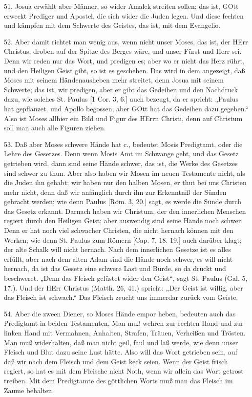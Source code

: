 51. Josua erwählt aber Männer, so wider Amalek streiten sollen; das ist, GOtt erweckt Prediger und Apostel, die sich wider die Juden legen. Und diese fechten und kämpfen mit dem Schwerte des Geistes, das ist, mit dem Evangelio.

52. Aber damit richtet man wenig aus, wenn nicht unser Moses, das ist, der HErr Christus, droben auf der Spitze des Berges wäre, und unser Fürst und Herr sei. Denn wir reden nur das Wort, und predigen es; aber wo er nicht das Herz rührt, und den Heiligen Geist gibt, so ist es geschehen. Das wird in dem angezeigt, daß Moses mit seinem Händenausheben mehr streitet, denn Josua mit seinem Schwerte; das ist, wir predigen, aber er gibt das Gedeihen und den Nachdruck dazu, wie solches St. Paulus [1 Cor. 3, 6.] auch bezeugt, da er spricht: „Paulus hat gepflanzet, und Apollo begossen, aber GOtt hat das Gedeihen dazu gegeben.“ Also ist Moses allhier ein Bild und Figur des HErrn Christi, denn auf Christum soll man auch alle Figuren ziehen.

53. Daß aber Moses schwere Hände hat c., bedeutet Mosis Predigtamt, oder die Lehre des Gesetzes. Denn wenn Mosis Amt im Schwange geht, und das Gesetz getrieben wird, dann sind seine Hände schwer, das ist, die Werke des Gesetzes sind schwer zu thun. Aber also haben wir Mosen im neuen Testamente nicht, als die Juden ihn gehabt; wir haben nur den halben Mosen, er thut bei uns Christen mehr nicht, denn daß wir anfänglich durch ihn zur Erkenntniß der Sünden gebracht werden; wie denn Paulus [Röm. 3, 20.] sagt, es werde die Sünde durch das Gesetz erkannt. Darnach haben wir Christum, der den innerlichen Menschen regiert durch den Heiligen Geist; aber auswendig sind seine Hände noch schwer. Denn er hat noch
viel schwacher Christen, die nicht hernach können mit den Werken; wie denn St. Paulus zum Römern [Cap. 7, 18. 19.] auch darüber klagt; der alte Schalk will nicht hernach. Nach dem innerlichen Gesetze ist es alles erfüllt, aber nach dem alten Adam sind die Hände noch schwer, es will nicht hernach, da ist das Gesetz eine schwere Last und Bürde, so da drückt und beschweret. „Denn das Fleisch gelüstet wider den Geist“, sagt St. Paulus (Gal. 5, 17.). Und der HErr Christus (Matth. 26, 41.) spricht: „Der Geist ist willig, aber das Fleisch ist schwach.“ Das Fleisch zeucht uns immerdar zurück vom Geiste.

54. Aber die zween Diener, so Moses Hände empor heben, bedeuten auch das Predigtamt in beiden Testamenten. Man muß wehren zur rechten Hand und zur linken Hand mit Vermahnen, Anhalten, Strafen, Träuen, Verheißen und Trösten. Man muß widerhalten, daß man nicht geil, faul und laß werde, wie denn unser Fleisch und Blut dazu seine Lust hätte. Also will das Wort getrieben sein, auf daß wir nach dem Fleisch und dem Geist keck seien. Wenn der Geist frisch regiert, so hat es mit dem Fleische nicht Noth, wenn wir allein das Wort getrost treiben. Mit dem Predigtamte des göttlichen Worts muß man das Fleisch im Zaume behalten.

